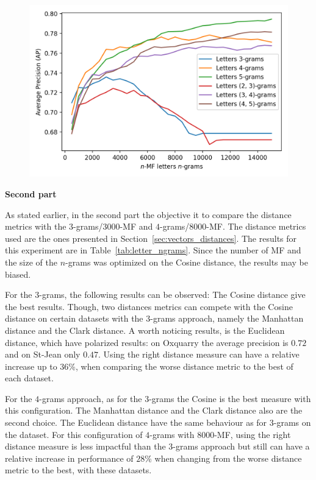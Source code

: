 \begin{figure}
  \label{fig:letter_ngrams_st_jean}
  \includegraphics[width=\linewidth]{img/letter_ngrams_st_jean.png}
\end{figure}

\textbf{Second part}

As stated earlier, in the second part the objective it to compare the distance metrics with the $3$-grams/$3000$-MF and $4$-grams/$8000$-MF.
The distance metrics used are the ones presented in Section~\ref{sec:vectors_distances}.
The results for this experiment are in Table~\ref{tab:letter_ngrams}.
Since the number of MF and the size of the $n$-grams was optimized on the Cosine distance, the results may be biased.

For the $3$-grams, the following results can be observed:
The Cosine distance give the best results.
Though, two distances metrics can compete with the Cosine distance on certain datasets with the $3$-grams approach, namely the Manhattan distance and the Clark distance.
A worth noticing results, is the Euclidean distance, which have polarized results: on Oxquarry the average precision is $0.72$ and on St-Jean only $0.47$.
Using the right distance measure can have a relative increase up to $36$\%, when comparing the worse distance metric to the best of each dataset.

For the $4$-grams approach, as for the $3$-grams the Cosine is the best measure with this configuration.
The Manhattan distance and the Clark distance also are the second choice.
The Euclidean distance have the same behaviour as for $3$-grams on the dataset.
For this configuration of $4$-grams with $8000$-MF, using the right distance measure is less impactful than the $3$-grams approach but still can have a relative increase in performance of $28$\% when changing from the worse distance metric to the best, with these datasets.

